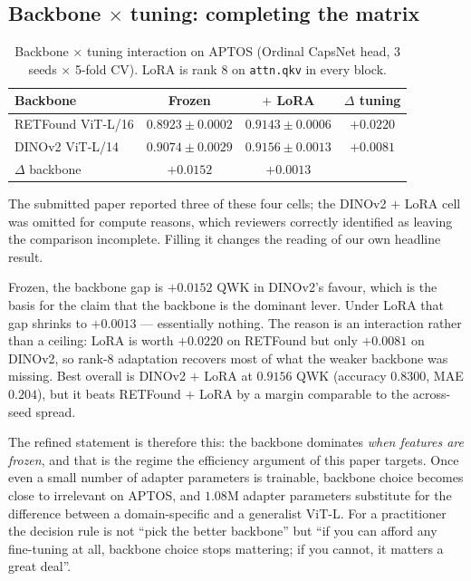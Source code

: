 \documentclass[journal]{IEEEtran}
\begin{document}
\subsection{Backbone $\times$ tuning: completing the matrix}
\label{sec:backbone-tuning}
\begin{table}[!t]
\centering
\caption{Backbone $\times$ tuning interaction on APTOS (Ordinal CapsNet head, 3 seeds $\times$ 5-fold CV). LoRA is rank 8 on \texttt{attn.qkv} in every block.}
\label{tab:backbonetuning}
\begin{tabular}{lccc}
\toprule
Backbone & Frozen & $+$ LoRA & $\Delta$ tuning \\
\midrule
RETFound ViT-L/16 & $0.8923 \pm 0.0002$ & $0.9143 \pm 0.0006$ & $+0.0220$ \\
DINOv2 ViT-L/14   & $0.9074 \pm 0.0029$ & $0.9156 \pm 0.0013$ & $+0.0081$ \\
\midrule
$\Delta$ backbone & $+0.0152$ & $+0.0013$ & \\
\bottomrule
\end{tabular}
\end{table}

The submitted paper reported three of these four cells; the DINOv2 $+$ LoRA cell was omitted for compute reasons, which reviewers correctly identified as leaving the comparison incomplete. Filling it changes the reading of our own headline result.

Frozen, the backbone gap is $+0.0152$ QWK in DINOv2's favour, which is the basis for the claim that the backbone is the dominant lever. Under LoRA that gap shrinks to $+0.0013$ --- essentially nothing. The reason is an interaction rather than a ceiling: LoRA is worth $+0.0220$ on RETFound but only $+0.0081$ on DINOv2, so rank-8 adaptation recovers most of what the weaker backbone was missing. Best overall is DINOv2 $+$ LoRA at $0.9156$ QWK (accuracy $0.8300$, MAE $0.204$), but it beats RETFound $+$ LoRA by a margin comparable to the across-seed spread.

The refined statement is therefore this: the backbone dominates \emph{when features are frozen}, and that is the regime the efficiency argument of this paper targets. Once even a small number of adapter parameters is trainable, backbone choice becomes close to irrelevant on APTOS, and $1.08$M adapter parameters substitute for the difference between a domain-specific and a generalist ViT-L. For a practitioner the decision rule is not ``pick the better backbone'' but ``if you can afford any fine-tuning at all, backbone choice stops mattering; if you cannot, it matters a great deal''.
\end{document}
